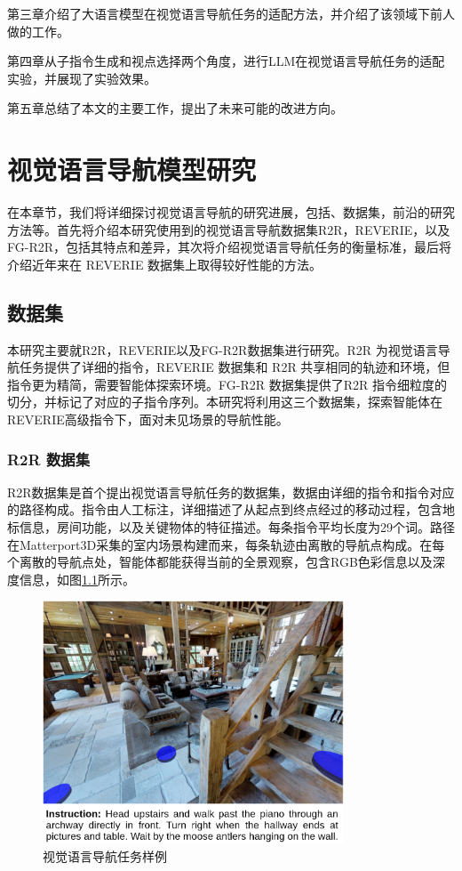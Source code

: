 \documentclass[bachelor]{thesis-uestc}
\begin{document}
第三章介绍了大语言模型在视觉语言导航任务的适配方法，并介绍了该领域下前人做的工作。

第四章从子指令生成和视点选择两个角度，进行LLM在视觉语言导航任务的适配实验，并展现了实验效果。

第五章总结了本文的主要工作，提出了未来可能的改进方向。

\chapter{视觉语言导航模型研究}

在本章节，我们将详细探讨视觉语言导航的研究进展，包括、数据集，前沿的研究方法等。首先将介绍本研究使用到的视觉语言导航数据集R2R，REVERIE，以及FG-R2R，包括其特点和差异，其次将介绍视觉语言导航任务的衡量标准，最后将介绍近年来在 REVERIE 数据集上取得较好性能的方法。

\section{数据集}

本研究主要就R2R，REVERIE以及FG-R2R数据集进行研究。R2R 为视觉语言导航任务提供了详细的指令，REVERIE 数据集和 R2R 共享相同的轨迹和环境，但指令更为精简，需要智能体探索环境。FG-R2R 数据集提供了R2R 指令细粒度的切分，并标记了对应的子指令序列。本研究将利用这三个数据集，探索智能体在REVERIE高级指令下，面对未见场景的导航性能。

\subsection{R2R 数据集}
R2R数据集是首个提出视觉语言导航任务的数据集，数据由详细的指令和指令对应的路径构成。指令由人工标注，详细描述了从起点到终点经过的移动过程，包含地标信息，房间功能，以及关键物体的特征描述。每条指令平均长度为29个词。路径在Matterport3D采集的室内场景构建而来，每条轨迹由离散的导航点构成。在每个离散的导航点处，智能体都能获得当前的全景观察，包含RGB色彩信息以及深度信息，如图\ref{r2r}所示。

\begin {figure}[h]
\centering %
\includegraphics[width=0.8\textwidth]{4556-042815.png}
\caption{视觉语言导航任务样例} %
\label{r2r}
\end {figure}
\end{document}
